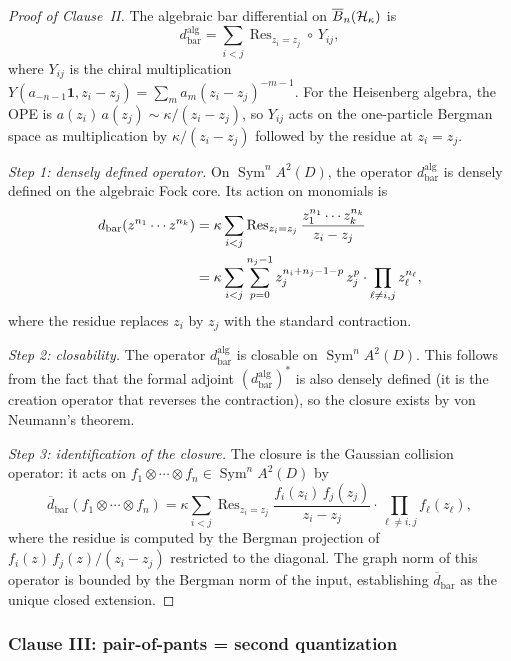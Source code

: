 \begin{proof}[Proof of Clause~II]
The algebraic bar differential on $\overline{B}_n(\mathcal{H}_\kappa)$ is
\[
d_{\mathrm{bar}}^{\mathrm{alg}}
= \sum_{i < j}
\operatorname{Res}_{z_i = z_j}
\circ\, Y_{ij},
\]
where $Y_{ij}$ is the chiral multiplication
$Y(a_{-n-1}\mathbf{1}, z_i - z_j)
= \sum_m a_m (z_i - z_j)^{-m-1}$.
For the Heisenberg algebra, the OPE is
$a(z_i)\,a(z_j) \sim \kappa/(z_i - z_j)$,
so $Y_{ij}$ acts on the one-particle Bergman space as
multiplication by $\kappa/(z_i - z_j)$ followed by the residue
at $z_i = z_j$.

\emph{Step 1: densely defined operator.}
On $\operatorname{Sym}^n A^2(D)$, the operator
$d_{\mathrm{bar}}^{\mathrm{alg}}$ is densely defined on the
algebraic Fock core. Its action on monomials is
\begin{align}
d_{\mathrm{bar}}(z^{n_1} \cdots z^{n_k})
&= \kappa \sum_{i < j}
\operatorname{Res}_{z_i = z_j}
\frac{z_1^{n_1} \cdots z_k^{n_k}}{z_i - z_j}
\notag\\
&= \kappa \sum_{i < j}
\sum_{p=0}^{n_j-1}
z_j^{n_i + n_j - 1 - p}\, z_j^p
\cdot \prod_{\ell \neq i,j} z_\ell^{n_\ell},
\label{eq:thqg-X-bar-monomial-action}
\end{align}
where the residue replaces $z_i$ by $z_j$ with the standard
contraction.

\emph{Step 2: closability.}
The operator $d_{\mathrm{bar}}^{\mathrm{alg}}$ is closable
on $\operatorname{Sym}^n A^2(D)$. This follows from the
fact that the formal adjoint $(d_{\mathrm{bar}}^{\mathrm{alg}})^*$
is also densely defined (it is the creation operator that reverses
the contraction), so the closure exists by von Neumann's theorem.

\emph{Step 3: identification of the closure.}
The closure is the Gaussian collision operator: it acts on
$f_1 \otimes \cdots \otimes f_n \in \operatorname{Sym}^n A^2(D)$
by
\[
\overline{d}_{\mathrm{bar}}(f_1 \otimes \cdots \otimes f_n)
= \kappa \sum_{i < j}
\operatorname{Res}_{z_i = z_j}
\frac{f_i(z_i)\,f_j(z_j)}{z_i - z_j}
\cdot \prod_{\ell \neq i,j} f_\ell(z_\ell),
\]
where the residue is computed by the Bergman projection
of $f_i(z)\,f_j(z) / (z_i - z_j)$ restricted to the diagonal.
The graph norm of this operator is bounded by the Bergman
norm of the input, establishing $\overline{d}_{\mathrm{bar}}$
as the unique closed extension.
\end{proof}

\subsubsection{Clause III: pair-of-pants = second quantization}

